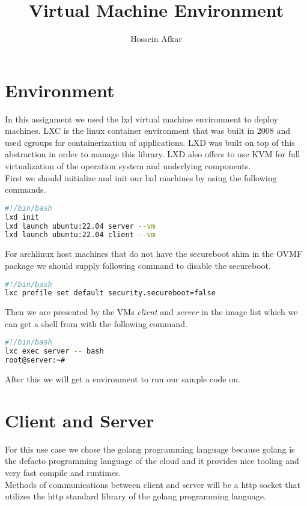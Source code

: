 \documentclass[a4paper, 11pt]{article}
\title{Virtual Machine Environment}
\author{Hossein Afkar}
\theoremstyle{nonumberplain}
\begin{document}
\maketitle

\section{Environment}
In this assignment we used the lxd virtual machine environment to deploy
machines. LXC is the linux container environment that was built in 2008 and
used cgroups for containerization of applications. LXD was built on top of
this abstraction in order to manage this library. LXD also offers to use KVM
for full virtualization of the operation system and underlying components. \\
First we should initialize and init our lxd machines by using the following
commands.
\begin{lstlisting}[language=bash]
#!/bin/bash
lxd init
lxd launch ubuntu:22.04 server --vm
lxd launch ubuntu:22.04 client --vm
\end{lstlisting}

For archlinux host machines that do not have the secureboot shim in the OVMF
package we should supply following command to disable the secureboot.

\begin{lstlisting}[language=bash]
#!/bin/bash
lxc profile set default security.secureboot=false
\end{lstlisting}

Then we are presented by the VMs \textit{client} and \textit{server} in the
image list which we can get a shell from with the following command.

\begin{lstlisting}[language=bash]
#!/bin/bash
lxc exec server -- bash
root@server:~#
\end{lstlisting}

After this we will get a environment to run our sample code on.

\section{Client and Server}
For this use case we chose the golang programming language because golang is
the defacto programming language of the cloud and it provides nice tooling and
very fast compile and runtimes. \\
Methods of communications between client and server will be a http socket
that utilizes the http standard library of the golang programming language. \\
\end{document}
